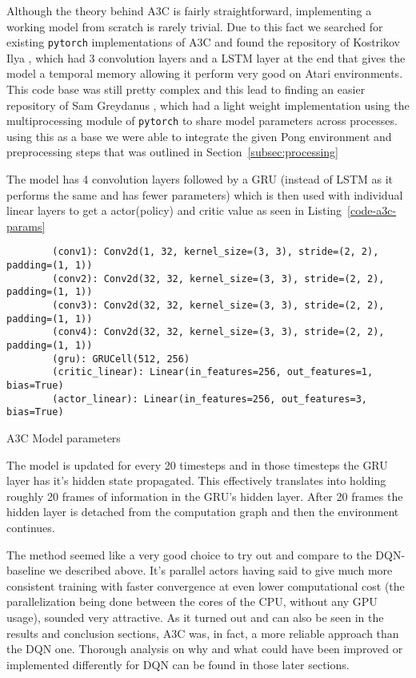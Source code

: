 \bigskip
\noindent
Although the theory behind A3C is fairly straightforward, implementing a working model from scratch is rarely trivial. Due to this fact we searched for existing \texttt{pytorch} implementations of A3C and found the repository of Kostrikov Ilya \cite{orig_a3c}, which had 3 convolution layers and a LSTM layer at the end that gives the model a temporal memory allowing it perform very good on Atari environments. This code base was still pretty complex and this lead to finding an easier repository of Sam Greydanus \cite{baby-a3c}, which had a light weight implementation using the multiprocessing module of \texttt{pytorch} to share model parameters across processes. using this as a base we were able to integrate the given Pong environment and preprocessing steps that was outlined in Section~\ref{subsec:processing}

The model has 4 convolution layers followed by a GRU (instead of LSTM as it performs the same and has fewer parameters) which is then used with individual linear layers to get a actor(policy) and critic value as seen in Listing~\ref{code-a3c-params}

\begin{listing}[ht]
    \begin{verbatim}
        (conv1): Conv2d(1, 32, kernel_size=(3, 3), stride=(2, 2), padding=(1, 1)) 
        (conv2): Conv2d(32, 32, kernel_size=(3, 3), stride=(2, 2), padding=(1, 1))
        (conv3): Conv2d(32, 32, kernel_size=(3, 3), stride=(2, 2), padding=(1, 1))
        (conv4): Conv2d(32, 32, kernel_size=(3, 3), stride=(2, 2), padding=(1, 1))
        (gru): GRUCell(512, 256)
        (critic_linear): Linear(in_features=256, out_features=1, bias=True)       
        (actor_linear): Linear(in_features=256, out_features=3, bias=True)  
      \end{verbatim}
    \caption{A3C Model parameters}
    \label{code-a3c-params}
\end{listing}

The model is updated for every 20 timesteps and in those timesteps the GRU layer has it's hidden state propagated. This effectively translates into holding roughly 20 frames of information in the GRU's hidden layer. After 20 frames the hidden layer is detached from the computation graph and then the environment continues.

The method seemed like a very good choice to try out and compare to the DQN-baseline we described above. It's parallel actors having said to give much more consistent training with faster convergence at even lower computational cost (the parallelization being done between the cores of the CPU, without any GPU usage), sounded very attractive. As it turned out and can also be seen in the results and conclusion sections, A3C was, in fact, a more reliable approach than the DQN one. Thorough analysis on why and what could have been improved  or implemented differently for DQN can be found in those later sections.